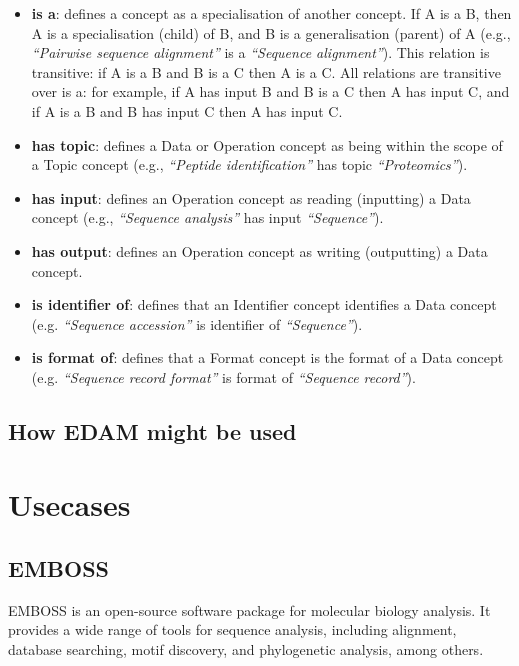 \documentclass{scrartcl}
\begin{document}
\begin{itemize}
  \item \textbf{is a}: defines a concept as a specialisation of 
    another concept. If A is a B, then A is a specialisation (child) 
    of B, and B is a generalisation (parent) of A (e.g., 
    \textit{“Pairwise sequence alignment”} is a \textit{“Sequence alignment”}).
    This relation is transitive: if A is a B and B is a C then A is a C.
    All relations are transitive over is a: for example, if A 
    has input B and B is a C then A has input C, 
    and if A is a B and B has input C then A has input C.
  \item \textbf{has topic}: defines a Data or Operation concept as being 
    within the scope of a Topic concept (e.g., \textit{“Peptide identification”}
    has topic \textit{“Proteomics”}).
  \item \textbf{has input}: defines an Operation concept as reading (inputting) 
    a Data concept (e.g., \textit{“Sequence analysis”} has input 
    \textit{“Sequence”}).
  \item \textbf{has output}: defines an Operation concept as writing (outputting) 
    a Data concept.
  \item \textbf{is identifier of}: defines that an Identifier concept identifies 
    a Data concept (e.g. \textit{“Sequence accession”} 
    is identifier of \textit{“Sequence”}).
  \item \textbf{is format of}: defines that a Format concept is the format of a 
    Data concept (e.g. \textit{“Sequence record format”} is format 
    of \textit{“Sequence record”}).
\end{itemize}

\subsection{How EDAM might be used}

\newpage

\section{Usecases}

\subsection{EMBOSS}
EMBOSS is an open-source software package for molecular biology 
  analysis. It provides a wide range of tools for sequence analysis, including alignment, database searching, 
  motif discovery, and phylogenetic analysis, among others.
\end{document}
